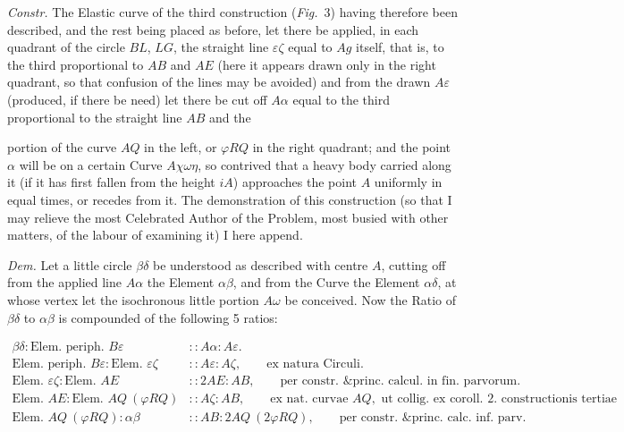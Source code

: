 \documentclass{article}
\begin{document}
\emph{Constr.} The Elastic curve of the third construction (\emph{Fig.}~3) having therefore been
described, and the rest being placed as before, let there be applied, in each quadrant of the circle
$BL$, $LG$, the straight line $\varepsilon\zeta$ equal to $Ag$ itself, that is, to the third
proportional to $AB$ and $AE$ (here it appears drawn only in the right quadrant, so that confusion
of the lines may be avoided) and from the drawn $A\varepsilon$ (produced, if there be need) let there
be cut off $A\alpha$ equal to the third proportional to the straight line $AB$ and the

portion of the curve $AQ$ in the left, or $\varphi RQ$ in the right quadrant; and the point $\alpha$
will be on a certain Curve $A\chi\omega\eta$, so contrived that a heavy body carried along it (if it
has first fallen from the height $iA$) approaches the point $A$ uniformly in equal times, or recedes
from it. The demonstration of this construction (so that I may relieve the most Celebrated Author of
the Problem, most busied with other matters, of the labour of examining it) I here append.


\emph{Dem.} Let a little circle $\beta\delta$ be understood as described with centre $A$, cutting off
from the applied line $A\alpha$ the Element $\alpha\beta$, and from the Curve the Element
$\alpha\delta$, at whose vertex let the isochronous little portion $A\omega$ be conceived. Now the
Ratio of $\beta\delta$ to $\alpha\beta$ is compounded of the following 5 ratios:

\[
\begin{aligned}
\beta\delta : \text{Elem. periph. } B\varepsilon &:: A\alpha : A\varepsilon. \\
\text{Elem. periph. } B\varepsilon : \text{Elem. } \varepsilon\zeta &:: A\varepsilon : A\zeta, \qquad \text{ex natura Circuli.} \\
\text{Elem. } \varepsilon\zeta : \text{Elem. } AE &:: 2AE : AB, \qquad \text{per constr. \& princ. calcul. in fin. parvorum.} \\
\text{Elem. } AE : \text{Elem. } AQ\ (\varphi RQ) &:: A\zeta : AB, \qquad \text{ex nat. curvae } AQ, \text{ ut collig. ex coroll. 2. constructionis tertiae praeced.} \\
\text{Elem. } AQ\ (\varphi RQ) : \alpha\beta &:: AB : 2AQ\ (2\varphi RQ), \qquad \text{per constr. \& princ. calc. inf. parv.}
\end{aligned}
\]
\end{document}
